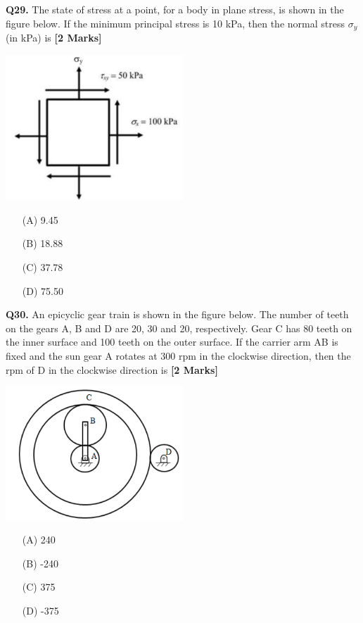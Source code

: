 \documentclass[11pt]{article}
\newcommand{\questionb}[2]{
    \noindent\textbf{Q#2.} #1 \hfill \textbf{[2 Marks]}
}
\begin{document}
\questionb{The state of stress at a point, for a body in plane stress, is shown in the figure below. If the minimum principal stress is 10 kPa, then the normal stress \( \sigma_y \) (in kPa) is}{29}
\begin{center}
\includegraphics[width=0.5\textwidth]{figures/29.png}
\end{center}
\begin{enumerate}
    \item[(A)] 9.45
    \item[(B)] 18.88
    \item[(C)] 37.78
    \item[(D)] 75.50
\end{enumerate}
\vspace{0.5cm}

\questionb{An epicyclic gear train is shown in the figure below. The number of teeth on the gears A, B and D are 20, 30 and 20, respectively. Gear C has 80 teeth on the inner surface and 100 teeth on the outer surface. If the carrier arm AB is fixed and the sun gear A rotates at 300 rpm in the clockwise direction, then the rpm of D in the clockwise direction is}{30}
\begin{center}
\includegraphics[width=0.5\textwidth]{figures/30.png}
\end{center}
\begin{enumerate}
    \item[(A)] 240
    \item[(B)] -240
    \item[(C)] 375
    \item[(D)] -375
\end{enumerate}
\vspace{0.5cm}
\end{document}

